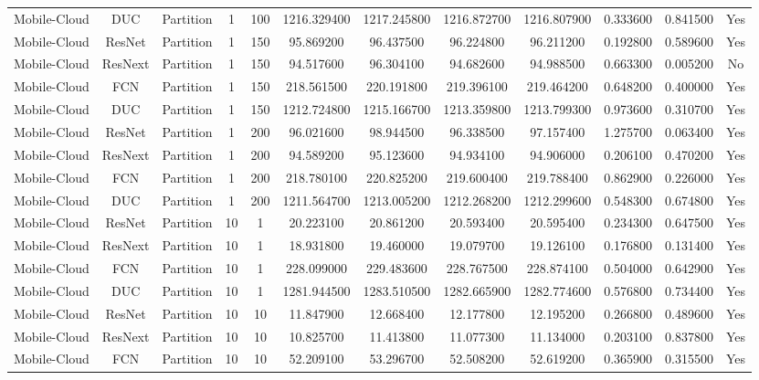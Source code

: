 \begin{tabular}{|c||c||c||c||c||c||c||c||c||c||c||c|}
Mobile-Cloud & DUC & Partition & 1 & 100 & 1216.329400 & 1217.245800 & 1216.872700 & 1216.807900 & 0.333600 & 0.841500 & Yes \\
Mobile-Cloud & ResNet & Partition & 1 & 150 & 95.869200 & 96.437500 & 96.224800 & 96.211200 & 0.192800 & 0.589600 & Yes \\
Mobile-Cloud & ResNext & Partition & 1 & 150 & 94.517600 & 96.304100 & 94.682600 & 94.988500 & 0.663300 & 0.005200 & No \\
Mobile-Cloud & FCN & Partition & 1 & 150 & 218.561500 & 220.191800 & 219.396100 & 219.464200 & 0.648200 & 0.400000 & Yes \\
Mobile-Cloud & DUC & Partition & 1 & 150 & 1212.724800 & 1215.166700 & 1213.359800 & 1213.799300 & 0.973600 & 0.310700 & Yes \\
Mobile-Cloud & ResNet & Partition & 1 & 200 & 96.021600 & 98.944500 & 96.338500 & 97.157400 & 1.275700 & 0.063400 & Yes \\
Mobile-Cloud & ResNext & Partition & 1 & 200 & 94.589200 & 95.123600 & 94.934100 & 94.906000 & 0.206100 & 0.470200 & Yes \\
Mobile-Cloud & FCN & Partition & 1 & 200 & 218.780100 & 220.825200 & 219.600400 & 219.788400 & 0.862900 & 0.226000 & Yes \\
Mobile-Cloud & DUC & Partition & 1 & 200 & 1211.564700 & 1213.005200 & 1212.268200 & 1212.299600 & 0.548300 & 0.674800 & Yes \\
Mobile-Cloud & ResNet & Partition & 10 & 1 & 20.223100 & 20.861200 & 20.593400 & 20.595400 & 0.234300 & 0.647500 & Yes \\
Mobile-Cloud & ResNext & Partition & 10 & 1 & 18.931800 & 19.460000 & 19.079700 & 19.126100 & 0.176800 & 0.131400 & Yes \\
Mobile-Cloud & FCN & Partition & 10 & 1 & 228.099000 & 229.483600 & 228.767500 & 228.874100 & 0.504000 & 0.642900 & Yes \\
Mobile-Cloud & DUC & Partition & 10 & 1 & 1281.944500 & 1283.510500 & 1282.665900 & 1282.774600 & 0.576800 & 0.734400 & Yes \\
Mobile-Cloud & ResNet & Partition & 10 & 10 & 11.847900 & 12.668400 & 12.177800 & 12.195200 & 0.266800 & 0.489600 & Yes \\
Mobile-Cloud & ResNext & Partition & 10 & 10 & 10.825700 & 11.413800 & 11.077300 & 11.134000 & 0.203100 & 0.837800 & Yes \\
Mobile-Cloud & FCN & Partition & 10 & 10 & 52.209100 & 53.296700 & 52.508200 & 52.619200 & 0.365900 & 0.315500 & Yes \\

\end{tabular}
